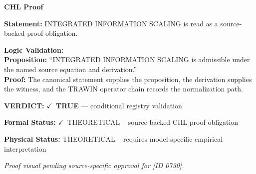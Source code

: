 \vspace{0.45em}
\noindent\textbf{CHL Proof}\par
\textbf{Statement:} INTEGRATED INFORMATION SCALING is read as a source-backed proof obligation.

\textbf{Logic Validation:}\\
\textbf{Proposition:} ``INTEGRATED INFORMATION SCALING is admissible under the named source equation and derivation.''\\
\textbf{Proof:} The canonical statement supplies the proposition, the derivation supplies the witness, and the TRAWIN operator chain records the normalization path.

\textbf{VERDICT:} \ensuremath{\checkmark}\ \textbf{TRUE} --- conditional registry validation

\textbf{Formal Status:} \ensuremath{\checkmark}\ THEORETICAL -- source-backed CHL proof obligation

\textbf{Physical Status:} THEORETICAL -- requires model-specific empirical interpretation
\par\vspace{0.45em}
\par
\vfill
\begingroup\footnotesize\itshape
Proof visual pending source-specific approval for [ID 0730].
\par\endgroup
\vfill
\endgroup
\endgroup
